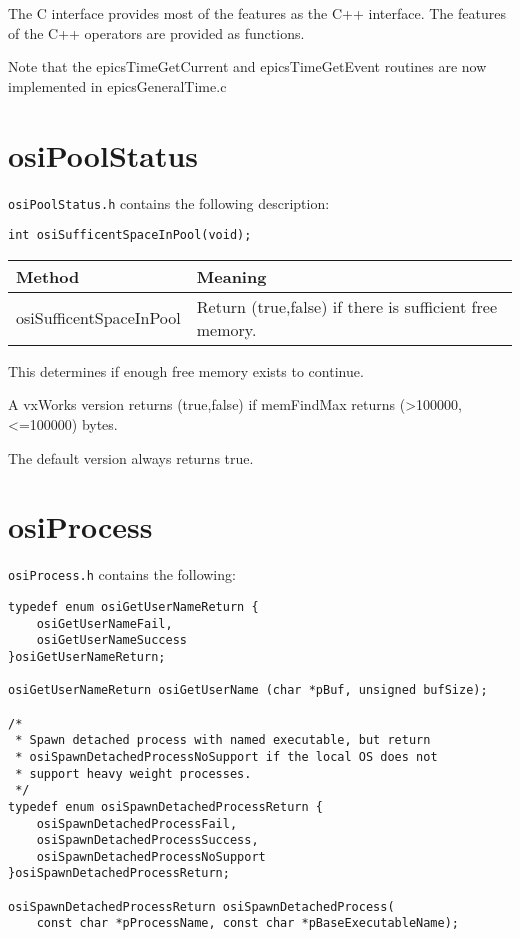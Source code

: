 The C interface provides most of the features as the C++ interface. The features of the C++ operators are provided as 
functions.

Note that the epicsTimeGetCurrent and epicsTimeGetEvent routines are now implemented in epicsGeneralTime.c

\section{osiPoolStatus}

\verb|osiPoolStatus.h| contains the following description:

\begin{verbatim}
int osiSufficentSpaceInPool(void);
\end{verbatim}

\begin{center}
\begin{longtable}{p{1.52778in}p{3.40278in}}
\textbf{Method} & \textbf{Meaning}\\
\hline
osiSufficentSpaceInPool & Return (true,false) if there is sufficient free memory.
\end{longtable}

\end{center}


This determines if enough free memory exists to continue.

A vxWorks version returns (true,false) if memFindMax returns (\textgreater{}100000, \textless{}=100000) bytes.

The default version always returns true.

\section{osiProcess}

\verb|osiProcess.h| contains the following:

\begin{verbatim}
typedef enum osiGetUserNameReturn {
    osiGetUserNameFail,
    osiGetUserNameSuccess
}osiGetUserNameReturn;

osiGetUserNameReturn osiGetUserName (char *pBuf, unsigned bufSize);

/*
 * Spawn detached process with named executable, but return
 * osiSpawnDetachedProcessNoSupport if the local OS does not
 * support heavy weight processes.
 */
typedef enum osiSpawnDetachedProcessReturn {
    osiSpawnDetachedProcessFail,
    osiSpawnDetachedProcessSuccess,
    osiSpawnDetachedProcessNoSupport
}osiSpawnDetachedProcessReturn;

osiSpawnDetachedProcessReturn osiSpawnDetachedProcess(
    const char *pProcessName, const char *pBaseExecutableName);

\end{verbatim}

